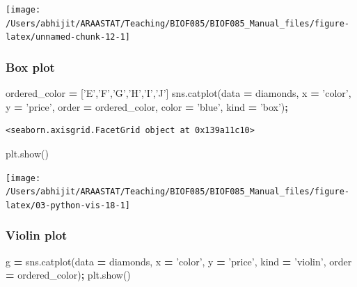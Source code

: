\documentclass[
  letterpaper,
]{scrbook}
\newenvironment{Shaded}{\begin{snugshade}}{\end{snugshade}}
\newcommand{\NormalTok}[1]{#1}
\newcommand{\OperatorTok}[1]{\textcolor[rgb]{0.81,0.36,0.00}{\textbf{#1}}}
\newcommand{\StringTok}[1]{\textcolor[rgb]{0.31,0.60,0.02}{#1}}
\begin{document}
\begin{center}\texttt{[image: /Users/abhijit/ARAASTAT/Teaching/BIOF085/BIOF085\_Manual\_files/figure-latex/unnamed-chunk-12-1]} \end{center}

\hypertarget{box-plot-1}{%
\subsubsection{Box plot}\label{box-plot-1}}

\begin{Shaded}
\begin{Highlighting}[]
\NormalTok{ordered_color }\OperatorTok{=}\NormalTok{ [}\StringTok{'E'}\NormalTok{,}\StringTok{'F'}\NormalTok{,}\StringTok{'G'}\NormalTok{,}\StringTok{'H'}\NormalTok{,}\StringTok{'I'}\NormalTok{,}\StringTok{'J'}\NormalTok{]}
\NormalTok{sns.catplot(data }\OperatorTok{=}\NormalTok{ diamonds, x }\OperatorTok{=} \StringTok{'color'}\NormalTok{, y }\OperatorTok{=} \StringTok{'price'}\NormalTok{, }
\NormalTok{            order }\OperatorTok{=}\NormalTok{ ordered_color, color }\OperatorTok{=} \StringTok{'blue'}\NormalTok{, kind }\OperatorTok{=} \StringTok{'box'}\NormalTok{)}\OperatorTok{;}
\end{Highlighting}
\end{Shaded}

\begin{verbatim}
<seaborn.axisgrid.FacetGrid object at 0x139a11c10>
\end{verbatim}

\begin{Shaded}
\begin{Highlighting}[]
\NormalTok{plt.show()}
\end{Highlighting}
\end{Shaded}

\begin{center}\texttt{[image: /Users/abhijit/ARAASTAT/Teaching/BIOF085/BIOF085\_Manual\_files/figure-latex/03-python-vis-18-1]} \end{center}

\hypertarget{violin-plot}{%
\subsubsection{Violin plot}\label{violin-plot}}

\begin{Shaded}
\begin{Highlighting}[]
\NormalTok{g }\OperatorTok{=}\NormalTok{ sns.catplot(data }\OperatorTok{=}\NormalTok{ diamonds, x }\OperatorTok{=} \StringTok{'color'}\NormalTok{, y }\OperatorTok{=} \StringTok{'price'}\NormalTok{, }
\NormalTok{                kind }\OperatorTok{=} \StringTok{'violin'}\NormalTok{, order }\OperatorTok{=}\NormalTok{ ordered_color)}\OperatorTok{;}
\NormalTok{plt.show()}
\end{Highlighting}
\end{Shaded}
\end{document}
